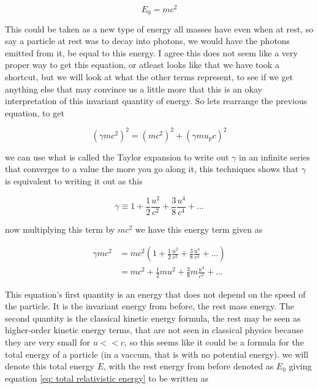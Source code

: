 \begin{equation}
	E_0=mc^2
\end{equation}

This could be taken as a new type of energy all masses have even when at rest, so say a particle at rest was to decay into photons, we would have the photons emitted from it, be equal to this energy.
I agree this does not seem like a very proper way to get this equation, or atleast looks like that we have took a shortcut, but we will look at what the other terms represent, to see if we get anything else that may convince us a little more that this is an okay interpretation of this invariant quantity of energy.
So lets rearrange the previous equation, to get

\begin{equation}
	\label{eq: total relativistic energy}
	\left( \gamma m {c}^2 \right)^2 = ({m}{c}^2)^2 + \left( \gamma {m}{u_p}{c}\right)^2
\end{equation}

we can use what is called the Taylor expansion to write out $\gamma$ in an infinite series that converges to a value the more you go along it, this techniques shows that $\gamma$ is equivalent to writing it out as this

\begin{equation}
	\gamma \equiv 1 + \frac{1}{2}\frac{u^2}{{c}^2} + \frac{3}{8}\frac{u^4}{c^4} + ...
\end{equation}

now multiplying this term by $mc^2$ we have this energy term given as

\begin{equation}
	\begin{aligned}
		\gamma {m}{c}^2 & = {m}{c}^2  \left(1 + \frac{1}{2}\frac{u^2}{{c}^2} + \frac{3}{8}\frac{u^4}{c^4} + ...
		\right)                                                                                                     \\
		                    & = {m}{c}^2 + \frac{1}{2}{m}{u}^2 + \frac{3}{8}m\frac{u^4}{{c}^2} + ...
	\end{aligned}
\end{equation}

This equation's first quantity is an energy that does not depend on the speed of the particle.
It is the invariant energy from before, the rest mass energy.
The second quantity is the classical kinetic energy formula, the rest may be seen as higher-order kinetic energy terms, that are not seen in classical physics because they are very small for ${u}<<{c}$, so this seems like it could be a formula for the total energy of a particle (in a vaccum, that is with no potential energy).
we will denote this total energy ${E}$, with the rest energy from before denoted as $E_0$ giving equation \eqref{eq: total relativistic energy} to be written as


